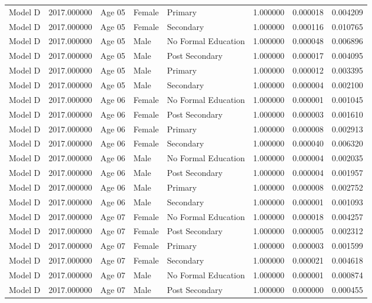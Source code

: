 \begin{table}[ht]
\begin{tabular}{lrlllrrr}
Model D & 2017.000000 & Age 05 & Female & Primary & 1.000000 & 0.000018 & 0.004209 \\
Model D & 2017.000000 & Age 05 & Female & Secondary & 1.000000 & 0.000116 & 0.010765 \\
Model D & 2017.000000 & Age 05 & Male & No Formal Education & 1.000000 & 0.000048 & 0.006896 \\
Model D & 2017.000000 & Age 05 & Male & Post Secondary & 1.000000 & 0.000017 & 0.004095 \\
Model D & 2017.000000 & Age 05 & Male & Primary & 1.000000 & 0.000012 & 0.003395 \\
Model D & 2017.000000 & Age 05 & Male & Secondary & 1.000000 & 0.000004 & 0.002100 \\
Model D & 2017.000000 & Age 06 & Female & No Formal Education & 1.000000 & 0.000001 & 0.001045 \\
Model D & 2017.000000 & Age 06 & Female & Post Secondary & 1.000000 & 0.000003 & 0.001610 \\
Model D & 2017.000000 & Age 06 & Female & Primary & 1.000000 & 0.000008 & 0.002913 \\
Model D & 2017.000000 & Age 06 & Female & Secondary & 1.000000 & 0.000040 & 0.006320 \\
Model D & 2017.000000 & Age 06 & Male & No Formal Education & 1.000000 & 0.000004 & 0.002035 \\
Model D & 2017.000000 & Age 06 & Male & Post Secondary & 1.000000 & 0.000004 & 0.001957 \\
Model D & 2017.000000 & Age 06 & Male & Primary & 1.000000 & 0.000008 & 0.002752 \\
Model D & 2017.000000 & Age 06 & Male & Secondary & 1.000000 & 0.000001 & 0.001093 \\
Model D & 2017.000000 & Age 07 & Female & No Formal Education & 1.000000 & 0.000018 & 0.004257 \\
Model D & 2017.000000 & Age 07 & Female & Post Secondary & 1.000000 & 0.000005 & 0.002312 \\
Model D & 2017.000000 & Age 07 & Female & Primary & 1.000000 & 0.000003 & 0.001599 \\
Model D & 2017.000000 & Age 07 & Female & Secondary & 1.000000 & 0.000021 & 0.004618 \\
Model D & 2017.000000 & Age 07 & Male & No Formal Education & 1.000000 & 0.000001 & 0.000874 \\
Model D & 2017.000000 & Age 07 & Male & Post Secondary & 1.000000 & 0.000000 & 0.000455 \\

\end{tabular}
\end{table}

